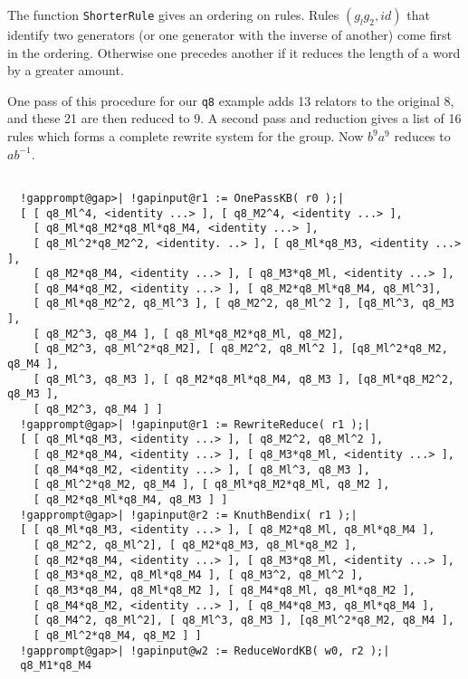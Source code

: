 \documentclass[a4paper,11pt]{report}
\begin{document}
{{{ The function \texttt{ShorterRule} gives an ordering on rules. Rules $(g_lg_2,id)$ that identify two generators (or one generator with the inverse of another)
come first in the ordering. Otherwise one precedes another if it reduces the
length of a word by a greater amount. 

 One pass of this procedure for our \texttt{q8} example adds 13 relators to the original 8, and these 21 are then reduced to
9. A second pass and reduction gives a list of 16 rules which forms a complete
rewrite system for the group. Now $b^9a^9$ reduces to $ab^{-1}$. 

 }

 
\begin{Verbatim}[commandchars=!@|,fontsize=\small,frame=single,label=Example]
  
  !gapprompt@gap>| !gapinput@r1 := OnePassKB( r0 );|
  [ [ q8_Ml^4, <identity ...> ], [ q8_M2^4, <identity ...> ], 
    [ q8_Ml*q8_M2*q8_Ml*q8_M4, <identity ...> ], 
    [ q8_Ml^2*q8_M2^2, <identity. ..> ], [ q8_Ml*q8_M3, <identity ...> ], 
    [ q8_M2*q8_M4, <identity ...> ], [ q8_M3*q8_Ml, <identity ...> ], 
    [ q8_M4*q8_M2, <identity ...> ], [ q8_M2*q8_Ml*q8_M4, q8_Ml^3], 
    [ q8_Ml*q8_M2^2, q8_Ml^3 ], [ q8_M2^2, q8_Ml^2 ], [q8_Ml^3, q8_M3 ], 
    [ q8_M2^3, q8_M4 ], [ q8_Ml*q8_M2*q8_Ml, q8_M2], 
    [ q8_M2^3, q8_Ml^2*q8_M2], [ q8_M2^2, q8_Ml^2 ], [q8_Ml^2*q8_M2, q8_M4 ], 
    [ q8_Ml^3, q8_M3 ], [ q8_M2*q8_Ml*q8_M4, q8_M3 ], [q8_Ml*q8_M2^2, q8_M3 ], 
    [ q8_M2^3, q8_M4 ] ] 
  !gapprompt@gap>| !gapinput@r1 := RewriteReduce( r1 );|
  [ [ q8_Ml*q8_M3, <identity ...> ], [ q8_M2^2, q8_Ml^2 ], 
    [ q8_M2*q8_M4, <identity ...> ], [ q8_M3*q8_Ml, <identity ...> ], 
    [ q8_M4*q8_M2, <identity ...> ], [ q8_Ml^3, q8_M3 ], 
    [ q8_Ml^2*q8_M2, q8_M4 ], [ q8_Ml*q8_M2*q8_Ml, q8_M2 ], 
    [ q8_M2*q8_Ml*q8_M4, q8_M3 ] ] 
  !gapprompt@gap>| !gapinput@r2 := KnuthBendix( r1 );|
  [ [ q8_Ml*q8_M3, <identity ...> ], [ q8_M2*q8_Ml, q8_Ml*q8_M4 ], 
    [ q8_M2^2, q8_Ml^2], [ q8_M2*q8_M3, q8_Ml*q8_M2 ], 
    [ q8_M2*q8_M4, <identity ...> ], [ q8_M3*q8_Ml, <identity ...> ], 
    [ q8_M3*q8_M2, q8_Ml*q8_M4 ], [ q8_M3^2, q8_Ml^2 ], 
    [ q8_M3*q8_M4, q8_Ml*q8_M2 ], [ q8_M4*q8_Ml, q8_Ml*q8_M2 ], 
    [ q8_M4*q8_M2, <identity ...> ], [ q8_M4*q8_M3, q8_Ml*q8_M4 ], 
    [ q8_M4^2, q8_Ml^2], [ q8_Ml^3, q8_M3 ], [q8_Ml^2*q8_M2, q8_M4 ], 
    [ q8_Ml^2*q8_M4, q8_M2 ] ]
  !gapprompt@gap>| !gapinput@w2 := ReduceWordKB( w0, r2 );|
  q8_M1*q8_M4
  
\end{Verbatim}
 }

}
\end{document}
